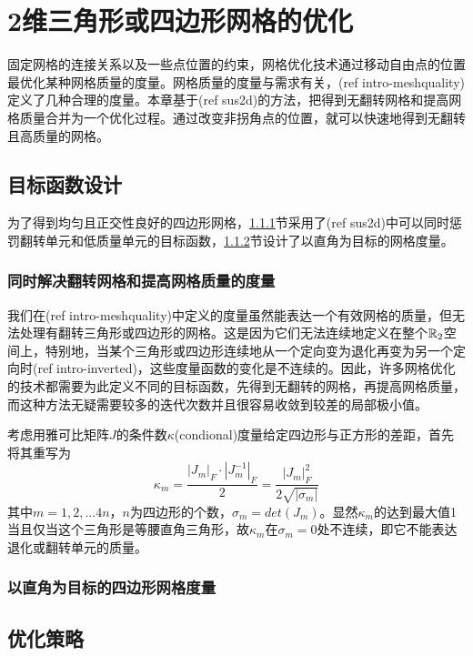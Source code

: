 \chapter{2维三角形或四边形网格的优化} \label{chap:sus2d}
固定网格的连接关系以及一些点位置的约束，网格优化技术通过移动自由点的位置最优化某种网格质量的度量。网格质量的度量与需求有关，(ref intro-meshquality)定义了几种合理的度量。本章基于(ref sus2d)的方法，把得到无翻转网格和提高网格质量合并为一个优化过程。通过改变非拐角点的位置，就可以快速地得到无翻转且高质量的网格。

\section{目标函数设计}\label{sec:objectives}
为了得到均匀且正交性良好的四边形网格，\ref{sec:sus}节采用了(ref sus2d)中可以同时惩罚翻转单元和低质量单元的目标函数，\ref{sec:vertical}节设计了以直角为目标的网格度量。
\subsection{同时解决翻转网格和提高网格质量的度量}\label{sec:sus}
我们在(ref intro-meshquality)中定义的度量虽然能表达一个有效网格的质量，但无法处理有翻转三角形或四边形的网格。这是因为它们无法连续地定义在整个$\mathbb{R}_2$空间上，特别地，当某个三角形或四边形连续地从一个定向变为退化再变为另一个定向时(ref intro-inverted)，这些度量函数的变化是不连续的。因此，许多网格优化的技术都需要为此定义不同的目标函数，先得到无翻转的网格，再提高网格质量，而这种方法无疑需要较多的迭代次数并且很容易收敛到较差的局部极小值。

考虑用雅可比矩阵$J$的条件数$\kappa$(condional)度量给定四边形与正方形的差距，首先将其重写为
\begin{equation} \label{equ:kappa}
\kappa_m=\frac{\left|J_m\right|_F \cdot \left|J_m^{-1}\right|_F}{2}=\frac{\left|J_m\right|_F^2}{2\sqrt{|\sigma_m|}}
\end{equation}
其中$m=1,2,...4n，n$为四边形的个数，$\sigma_m=det(J_m)$。显然$\kappa_m$的达到最大值1当且仅当这个三角形是等腰直角三角形，故$\kappa_m$在$\sigma_m=0$处不连续，即它不能表达退化或翻转单元的质量。
\subsection{以直角为目标的四边形网格度量}\label{sec:vertical}

\section{优化策略} \label{sec:optimization}
